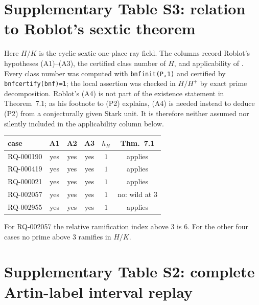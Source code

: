 \documentclass[11pt]{article}
\begin{document}
\section*{Supplementary Table S3: relation to Roblot's sextic theorem}

Here \(H/K\) is the cyclic sextic one-place ray field.  The columns
record Roblot's hypotheses (A1)--(A3), the certified class number of
\(H\), and applicability of \cite[Thm.~7.1]{Roblot2013}.  Every class
number was computed with \texttt{bnfinit(P,1)} and certified by
\texttt{bnfcertify(bnf)=1}; the local assertion was checked in
\(H/H^+\) by exact prime decomposition.  Roblot's (A4) is not part
of the existence statement in Theorem~7.1; as his footnote to (P2)
explains, (A4) is needed instead to deduce (P2) from a conjecturally
given Stark unit.  It is therefore neither assumed nor silently
included in the applicability column below.

\begin{center}
\begin{tabular}{@{}lccccc@{}}
\toprule
case & A1 & A2 & A3 & \(h_H\) & Thm.~7.1\\
\midrule
RQ-000190 & yes & yes & yes & \(1\) & applies\\
RQ-000419 & yes & yes & yes & \(1\) & applies\\
RQ-000021 & yes & yes & yes & \(1\) & applies\\
RQ-002057 & yes & yes & yes & \(1\) & no: wild at \(3\)\\
RQ-002955 & yes & yes & yes & \(1\) & applies\\
\bottomrule
\end{tabular}
\end{center}

For RQ-002057 the relative ramification index above \(3\) is \(6\).
For the other four cases no prime above \(3\) ramifies in \(H/K\).

\section*{Supplementary Table S2: complete Artin-label interval replay}
\end{document}
